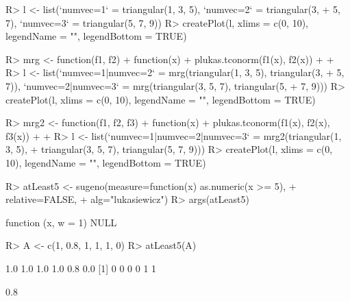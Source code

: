 \documentclass{article}\usepackage[]{graphicx}\usepackage[]{color}
\begin{document}
\begin{Schunk}
\begin{Sinput}
R> l <- list(`numvec=1` = triangular(1, 3, 5), `numvec=2` = triangular(3, 
+      5, 7), `numvec=3` = triangular(5, 7, 9))
R> createPlot(l, xlims = c(0, 10), legendName = "", legendBottom = TRUE)
\end{Sinput}
\end{Schunk}

\begin{Schunk}
\begin{Sinput}
R> mrg <- function(f1, f2) {
+      function(x) {
+          plukas.tconorm(f1(x), f2(x))
+      }
+  }
R> l <- list(`numvec=1|numvec=2` = mrg(triangular(1, 3, 5), triangular(3, 
+      5, 7)), `numvec=2|numvec=3` = mrg(triangular(3, 5, 7), triangular(5, 
+      7, 9)))
R> createPlot(l, xlims = c(0, 10), legendName = "", legendBottom = TRUE)
\end{Sinput}
\end{Schunk}

\begin{Schunk}
\begin{Sinput}
R> mrg2 <- function(f1, f2, f3) {
+      function(x) {
+          plukas.tconorm(f1(x), f2(x), f3(x))
+      }
+  }
R> l <- list(`numvec=1|numvec=2|numvec=3` = mrg2(triangular(1, 3, 5), 
+      triangular(3, 5, 7), triangular(5, 7, 9)))
R> createPlot(l, xlims = c(0, 10), legendName = "", legendBottom = TRUE)
\end{Sinput}
\end{Schunk}

\begin{Schunk}
% --begin: "quant1"
\begin{Sinput}
R> atLeast5 <- sugeno(measure=function(x) as.numeric(x >= 5),
+                     relative=FALSE,
+                     alg="lukasiewicz")
R> args(atLeast5)
\end{Sinput}
\begin{Soutput}
function (x, w = 1) 
NULL
\end{Soutput}
%
% --end: "quant1"
\end{Schunk}

\begin{Schunk}
% --begin: "quant2"
\begin{Sinput}
R> A <- c(1, 0.8, 1, 1, 1, 0)
R> atLeast5(A)
\end{Sinput}
\begin{Soutput}
[1] 1.0 1.0 1.0 1.0 0.8 0.0
[1] 0 0 0 0 1 1
\end{Soutput}
\begin{Soutput}
[1] 0.8
\end{Soutput}
%
% --end: "quant2"
\end{Schunk}
\end{document}

